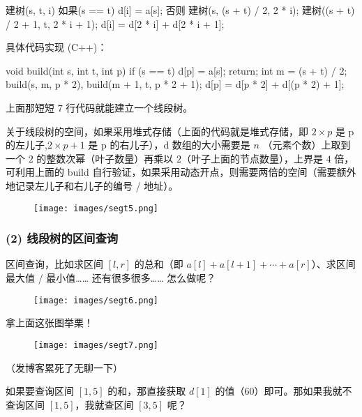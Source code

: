 \begin{cppcode}
建树(s, t, i) {
  如果(s == t) { d[i] = a[s]; }
  否则 {
    建树(s, (s + t) / 2, 2 * i);
    建树((s + t) / 2 + 1, t, 2 * i + 1);
    d[i] = d[2 * i] + d[2 * i + 1];
  }
}
\end{cppcode}

具体代码实现 (C++)：

\begin{cppcode}
void build(int s, int t, int p) {
  if (s == t) {
    d[p] = a[s];
    return;
  }
  int m = (s + t) / 2;
  build(s, m, p * 2), build(m + 1, t, p * 2 + 1);
  d[p] = d[p * 2] + d[(p * 2) + 1];
}
\end{cppcode}

上面那短短 $7$ 行代码就能建立一个线段树。

关于线段树的空间，如果采用堆式存储（上面的代码就是堆式存储，即 $2\times p$ 是 p 的左儿子,$2 \times p+1$ 是 p 的右儿子），d 数组的大小需要是 $n$ （元素个数）上取到一个 $2$ 的整数次幂（叶子数量）再乘以 $2$（叶子上面的节点数量），上界是 $4$ 倍，可利用上面的 build 自行验证，如果采用动态开点，则需要两倍的空间（需要额外地记录左儿子和右儿子的编号 / 地址）。

\begin{figure}[h]
\centering
\texttt{[image: images/segt5.png]} 

\end{figure}

\subsubsection{(2) 线段树的区间查询}

区间查询，比如求区间 $[l,r]$ 的总和（即 $a[l]+a[l+1]+ \cdots +a[r]$）、求区间最大值 / 最小值…… 还有很多很多…… 怎么做呢？

\begin{figure}[h]
\centering
\texttt{[image: images/segt6.png]} 

\end{figure}

拿上面这张图举栗！

\begin{figure}[h]
\centering
\texttt{[image: images/segt7.png]} 

\end{figure}

（发博客累死了无聊一下）

如果要查询区间 $[1,5]$ 的和，那直接获取 $d[1]$ 的值（$60$）即可。那如果我就不查询区间 $[1,5]$，我就查区间 $[3,5]$ 呢？

